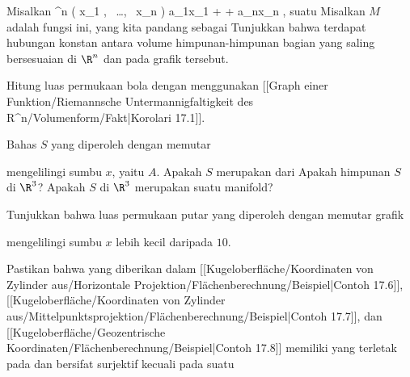 \setcounter{section}{17}


{}
{

Misalkan
\maabbeledisp {\varphi} {\R^n } {\R
} { \left(  x_1   , \,   \ldots  , \,   x_n                 \right) } {a_1x_1 + \cdots + a_nx_n
} {,}
suatu
Misalkan $M$ adalah
fungsi ini, yang kita pandang sebagai
Tunjukkan bahwa terdapat hubungan konstan antara volume himpunan-himpunan bagian yang saling bersesuaian di $\R^n$ dan pada grafik tersebut.

}
{} {}

{}
{

Hitung luas permukaan bola dengan menggunakan
[[Graph einer Funktion/Riemannsche Untermannigfaltigkeit des R^n/Volumenform/Fakt|Korolari 17.1]].

}
{} {}

{}
{

Bahas
 $S$ yang diperoleh dengan memutar

 {  }

mengelilingi sumbu $x$, yaitu $A$. Apakah $S$ merupakan
 dari
 Apakah himpunan $S$
 di $\R^3$? Apakah
 $S$ di $\R^3$ merupakan suatu manifold?

}
{} {}

{}
{

Tunjukkan bahwa luas permukaan putar yang diperoleh dengan memutar grafik

 {  }

mengelilingi sumbu $x$ lebih kecil daripada $10$.

}
{} {}

{}
{

Pastikan bahwa
yang diberikan dalam
[[Kugeloberfläche/Koordinaten von Zylinder aus/Horizontale Projektion/Flächenberechnung/Beispiel|Contoh 17.6]],
[[Kugeloberfläche/Koordinaten von Zylinder aus/Mittelpunktsprojektion/Flächenberechnung/Beispiel|Contoh 17.7]],
dan
[[Kugeloberfläche/Geozentrische Koordinaten/Flächenberechnung/Beispiel|Contoh 17.8]]
memiliki
yang terletak pada
dan bersifat surjektif kecuali pada suatu

}
{} {}

